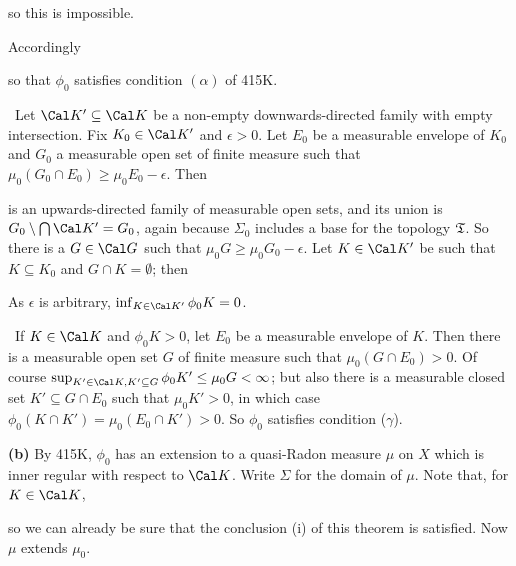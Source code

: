 {

\noindent so this is impossible.\ \Bang

Accordingly


\noindent so that $\phi_0$ satisfies condition $(\alpha)$ of 415K.

\medskip

\quad\grheadb\ Let $\Cal K'\subseteq\Cal K$ be a non-empty
downwards-directed family with empty intersection.   Fix $K_0\in\Cal K'$
and $\epsilon>0$.   Let $E_0$ be a measurable envelope of $K_0$ and
$G_0$ a measurable open set of finite measure such that $\mu_0(G_0\cap
E_0)\ge\mu_0E_0-\epsilon$.   Then


\noindent is an upwards-directed family of measurable open sets, and its
union is $G_0\setminus\bigcap\Cal K'=G_0$, again because $\Sigma_0$
includes
a base for the topology $\frak T$.   So there is a $G\in\Cal G$ such
that
$\mu_0G\ge\mu_0G_0-\epsilon$.   Let $K\in\Cal K'$ be such that
$K\subseteq K_0$ and $G\cap K=\emptyset$;  then


\noindent As $\epsilon$ is arbitrary, $\inf_{K\in\Cal K'}\phi_0K=0$.

\medskip

\quad\grheadc\ If $K\in\Cal K$ and $\phi_0K>0$, let $E_0$ be a
measurable envelope of $K$.   Then there is a measurable open set $G$ of
finite measure such that $\mu_0(G\cap E_0)>0$.   Of course
$\sup_{K'\in\Cal
K,K'\subseteq G}\phi_0K'\le\mu_0G<\infty$;  but also there is a
measurable closed set $K'\subseteq G\cap E_0$ such that $\mu_0K'>0$, in
which case $\phi_0(K\cap K')=\mu_0(E_0\cap K')>0$.   So $\phi_0$
satisfies condition ($\gamma$).\ \Qed

\medskip

{\bf (b)} By 415K, $\phi_0$ has an extension to a quasi-Radon measure
$\mu$
on $X$ which is inner regular with respect to $\Cal K$.   Write $\Sigma$
for the domain
of $\mu$.   Note that, for $K\in\Cal K$,

\noindent so we can already be sure that the conclusion (i) of this
theorem is satisfied.  Now $\mu$ extends $\mu_0$.

}
